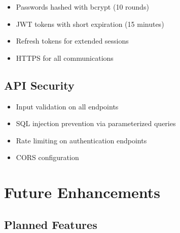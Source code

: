 \documentclass[12pt,a4paper]{article}
\begin{document}
\begin{itemize}
    \item Passwords hashed with bcrypt (10 rounds)
    \item JWT tokens with short expiration (15 minutes)
    \item Refresh tokens for extended sessions
    \item HTTPS for all communications
\end{itemize}

\subsection{API Security}

\begin{itemize}
    \item Input validation on all endpoints
    \item SQL injection prevention via parameterized queries
    \item Rate limiting on authentication endpoints
    \item CORS configuration
\end{itemize}

\section{Future Enhancements}

\subsection{Planned Features}
\end{document}
